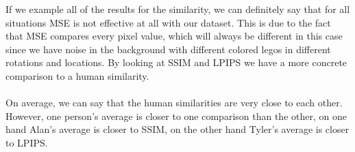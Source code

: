 \documentclass[]{article}
\begin{document}
If we example all of the results for the similarity, we can definitely say that for all situations MSE is not effective at all with our dataset. This is due to the fact that MSE compares every pixel value, which will always be different in this case since we have noise in the background with different colored legos in different rotations and locations. By looking at SSIM and LPIPS we have a more concrete comparison to a human similarity. \\
\\
On average, we can say that the human similarities are very close to each other. However, one person's average is closer to one comparison than the other, on one hand Alan's average is closer to SSIM, on the other hand Tyler's average is closer to LPIPS. \\
\end{document}
